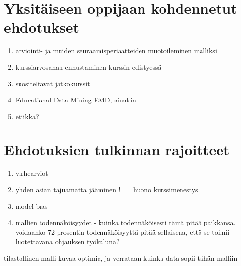 \color{red}
\section{Yksitäiseen oppijaan kohdennetut ehdotukset}

\begin{enumerate}
    \item arviointi- ja muiden seuraamisperiaatteiden muotoileminen malliksi
    \item kurssiarvosanan ennustaminen kurssin edistyessä
    \item suositeltavat jatkokurssit
    \item Educational Data Mining EMD, ainakin \citep{romeroEducationalDataMining2010}
    \item etiikka?! \citep{kailaEthicalConsiderationsLearning2019}
\end{enumerate}

\section{Ehdotuksien tulkinnan rajoitteet}

\begin{enumerate}
    \item virhearviot
    \item yhden asian tajuamatta jääminen !== huono kurssimenestys
    \item model bias
    \item mallien todennäköisyydet - kuinka todennäköisesti tämä pitää paikkansa. voidaanko 72 prosentin todennäköisyyttä pitää sellaisena, että se toimii luotettavana ohjauksen työkaluna?
\end{enumerate}


tilastollinen malli kuvaa optimia, ja verrataan kuinka data sopii tähän malliin